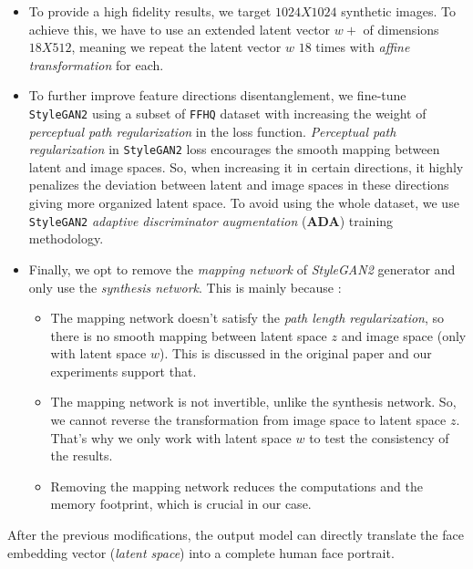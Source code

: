 \begin{itemize}
    \item To provide a high fidelity results, we target $1024X1024$ synthetic images. To achieve this, we have to use an extended latent vector $w+$ of dimensions $18X512$, meaning we repeat the latent vector $w$ $18$ times with \emph{affine transformation} for each.
    \item To further improve feature directions disentanglement, we fine-tune \texttt{StyleGAN2} using a subset of \texttt{FFHQ} dataset with increasing the weight of \emph{perceptual path regularization} in the loss function. \emph{Perceptual path regularization} in \texttt{StyleGAN2} loss encourages the smooth mapping between latent and image spaces. So, when increasing it in certain directions, it highly penalizes the deviation between latent and image spaces in these directions giving more organized latent space. To avoid using the whole dataset, we use \texttt{StyleGAN2} \emph{adaptive discriminator augmentation} (\textbf{ADA}) \cite{karras2020training} training methodology.
    \item Finally, we opt to remove the \emph{mapping network} of \emph{StyleGAN2} generator and only use the \emph{synthesis network}. This is mainly because :
    \begin{itemize}
        \item The mapping network doesn't satisfy the \emph{path length regularization}, so there is no smooth mapping between latent space $z$ and image space (only with latent space $w$). This is discussed in the original paper \cite{karras2020analyzing} and our experiments support that.
        \item The mapping network is not invertible, unlike the synthesis network. So, we cannot reverse the transformation from image space to latent space $z$. That's why we only work with latent space $w$ to test the consistency of the results.
        \item Removing the mapping network reduces the computations and the memory footprint, which is crucial in our case.
    \end{itemize}
\end{itemize}

After the previous modifications, the output model can directly translate the face embedding vector (\emph{latent space}) into a complete human face portrait. 

